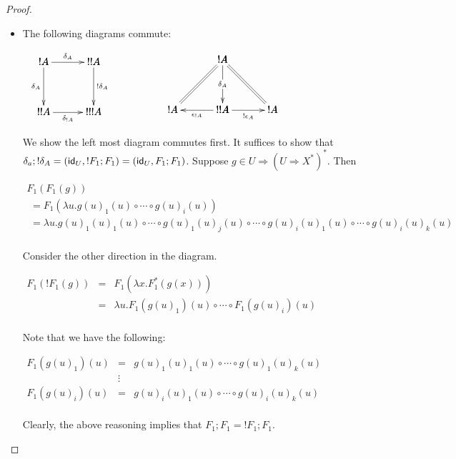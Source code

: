 \begin{proof}
\begin{report}
\begin{center}
\begin{itemize}
    \item The following diagrams commute:
      \begin{center}
        \begin{math}
          \begin{array}{lll}
            \bfig
            \square[!A`!!A`!!A`!!!A;\delta_A`\delta_A`!\delta_A`\delta_{!A}]
            \efig
            &
              \,\,\,\,\,\,\,\,\,\,\,\,\,\,\,\,\,\,\,\,
            &
              \bfig
             \Atrianglepair/=`->`=`<-`->/[!A`!A`!!A`!A;`\delta_A``\epsilon_{!A}`!\epsilon_A]
           \efig
          \end{array}
        \end{math}
      \end{center}
      We show the left most diagram commutes first.  It suffices to
      show that
      $\delta_a;!\delta_A = (\mathsf{id}_U,!F_1;F_1) = (\mathsf{id}_U,F_1;F_1)$.  
      Suppose $g \in U \Rightarrow (U \Rightarrow X^*)^*$.  Then       
      \begin{center}
        \small
        \begin{math}
          \begin{array}{lll}
            F_1(F_1(g)) \\
            \,\,= F_1(\lambda u.g(u)_1(u) \circ \cdots \circ g(u)_i(u))\\
            \,\,= \lambda u.g(u)_1(u)_1(u) \circ \cdots \circ g(u)_1(u)_j(u) \circ \cdots \circ g(u)_i(u)_1(u) \circ \cdots \circ g(u)_i(u)_k(u)\\
          \end{array}
        \end{math}
      \end{center}
      Consider the other direction in the diagram.  
      \begin{center}
        \begin{math}
          \begin{array}{lll}
            F_1(!F_1(g)) 
            & = & F_1(\lambda x.F^*_1(g(x)))\\
            & = & \lambda u.F_1(g(u)_1)(u) \circ \cdots \circ F_1(g(u)_i)(u)\\            
          \end{array}
        \end{math}
      \end{center}
      Note that we have the following:
      \begin{center}
        \begin{math}
          \begin{array}{lll}
            F_1(g(u)_1)(u) & = & g(u)_1(u)_1(u) \circ \cdots \circ g(u)_1(u)_k(u)\\
            & \vdots & \\
            F_1(g(u)_i)(u) & = & g(u)_i(u)_1(u) \circ \cdots \circ g(u)_i(u)_k(u)\\
          \end{array}
        \end{math}
      \end{center}
      Clearly, the above reasoning implies that $F_1;F_1 = !F_1;F_1$.


\end{itemize}
\end{center}
\end{report}
\end{proof}
